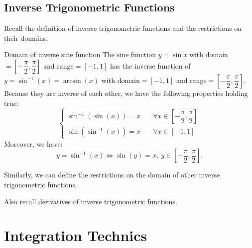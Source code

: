 \documentclass[12pt,a4paper]{article}
\begin{document}
\subsection{Inverse Trigonometric Functions}
Recall the definition of inverse trigonometric functions and the restrictions on their domains. 
\begin{thm}{Domain of inverse sine function}
	The sine function $y=\sin x$ with domain$=\left[-\dfrac{\pi}{2},\dfrac{\pi}{2}\right]$ and range$=[-1,1]$ has the inverse function of $y=\sin^{-1}(x)=\arcsin(x)$ with domain$=[-1,1]$ and range$=\left[-\dfrac{\pi}{2},\dfrac{\pi}{2}\right]$.\\
	Because they are inverse of each other, we have the following properties holding true:
	$$\begin{cases}
		\sin^{-1}(\sin(x))=x\quad&\forall x\in\left[-\dfrac{\pi}{2},\dfrac{\pi}{2}\right]\\
		\sin(\sin^{-1}(x))=x\quad&\forall x\in[-1,1]
	\end{cases}$$
	Moreover, we have: 
	$$y=\sin^{-1}(x) \Longleftrightarrow \sin(y)=x,\ y\in\left[-\dfrac{\pi}{2},\dfrac{\pi}{2}\right].$$
\end{thm}
Similarly, we can define the restrictions on the domain of other inverse trigonometric functions. 

Also recall derivatives of inverse trigonometric functions. 

\newpage
\section{Integration Technics}
\end{document}
